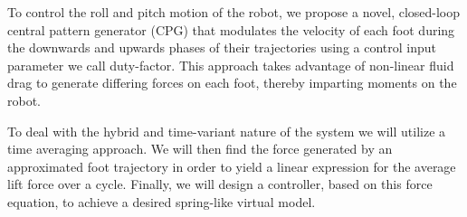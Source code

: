 To control the roll and pitch motion of the robot, we propose a novel, closed-loop central pattern generator (CPG) that modulates the velocity of each foot during the downwards and upwards phases of their trajectories using a control input parameter we call duty-factor. This approach takes advantage of non-linear fluid drag to generate differing forces on each foot, thereby imparting moments on the robot. 
	
To deal with the hybrid and time-variant nature of the system we will utilize a time averaging approach. We will then find the force generated by an approximated foot trajectory in order to yield a linear expression for the average lift force over a cycle.  Finally, we will design a controller, based on this force equation, to achieve a desired spring-like virtual model.
